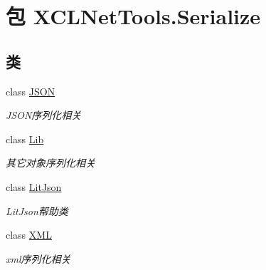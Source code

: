\hypertarget{namespace_x_c_l_net_tools_1_1_serialize}{\section{包 X\-C\-L\-Net\-Tools.\-Serialize}
\label{namespace_x_c_l_net_tools_1_1_serialize}
}
\subsection*{类}
\begin{DoxyCompactItemize}
\item 
class \hyperlink{class_x_c_l_net_tools_1_1_serialize_1_1_j_s_o_n}{J\-S\-O\-N}
\begin{DoxyCompactList}\small\item\em J\-S\-O\-N序列化相关 \end{DoxyCompactList}\item 
class \hyperlink{class_x_c_l_net_tools_1_1_serialize_1_1_lib}{Lib}
\begin{DoxyCompactList}\small\item\em 其它对象序列化相关 \end{DoxyCompactList}\item 
class \hyperlink{class_x_c_l_net_tools_1_1_serialize_1_1_lit_json}{Lit\-Json}
\begin{DoxyCompactList}\small\item\em Lit\-Json帮助类 \end{DoxyCompactList}\item 
class \hyperlink{class_x_c_l_net_tools_1_1_serialize_1_1_x_m_l}{X\-M\-L}
\begin{DoxyCompactList}\small\item\em xml序列化相关 \end{DoxyCompactList}\end{DoxyCompactItemize}
